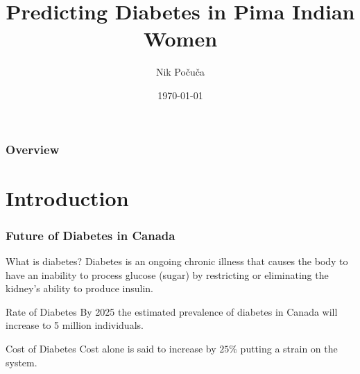 \documentclass{beamer}
\title[Pima Indians]{Predicting Diabetes in  Pima Indian Women} %
\author{Nik Po\v cu\v ca} %
\institute[McMaster University] %
{
McMaster University \\ %
\medskip
\textit{Data Science 780} %
}
\date{\today} %
\begin{document}
\begin{frame}
\titlepage %
\end{frame}

\begin{frame}
\frametitle{Overview} %
\tableofcontents %
\end{frame}


\section{Introduction} %

\begin{frame}
\frametitle{Future of Diabetes in Canada}
\begin{block}{What is diabetes?}
Diabetes is an ongoing chronic illness that causes the body to have an inability to process glucose (sugar) by restricting or eliminating the kidney's ability to produce insulin. 
\end{block}
\begin{block}{Rate of Diabetes}
By 2025 the estimated prevalence of diabetes in Canada will increase to 5 million individuals.
\end{block}
\begin{block}{Cost of Diabetes}
Cost alone is said to increase by $ 25 \%$ putting a strain on the system. 
\end{block}
\end{frame}
\end{document}
